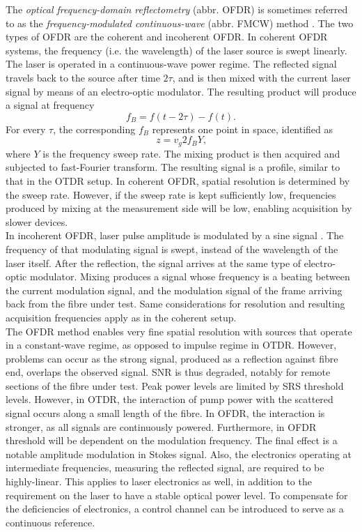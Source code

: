 \documentclass{standalone}
\begin{document}
The \textit{optical frequency-domain reflectometry} (abbr. OFDR) is sometimes referred to as the \textit{frequency-modulated continuous-wave} (abbr. FMCW) method \cite{Farahani1999}\cite{Hartog2017}. The two types of OFDR are the coherent and incoherent OFDR. In coherent OFDR systems, the frequency (i.e. the wavelength) of the laser source is swept linearly. The laser is operated in a continuous-wave power regime. The reflected signal travels back to the source after time $2 \tau$, and is then mixed with the current laser signal by means of an electro-optic modulator. The resulting product will produce a signal at frequency
\begin{equation}
f_B = f(t - 2 \tau) - f(t) \textrm{.}
\end{equation}
For every $\tau$, the corresponding $f_B$ represents one point in space, identified as
\begin{equation}
z = v_g 2 f_B Y \textrm{,}
\end{equation}
where $Y$ is the frequency sweep rate. The mixing product is then acquired and subjected to fast-Fourier transform. The resulting signal is a profile, similar to that in the OTDR setup. In coherent OFDR, spatial resolution is determined by the sweep rate. However, if the sweep rate is kept sufficiently low, frequencies produced by mixing at the measurement side will be low, enabling acquisition by slower devices. \\

In incoherent OFDR, laser pulse amplitude is modulated by a sine signal \cite{emir}. The frequency of that modulating signal is swept, instead of the wavelength of the laser itself. After the reflection, the signal arrives at the same type of electro-optic modulator. Mixing produces a signal whose frequency is a beating between the current modulation signal, and the modulation signal of the frame arriving back from the fibre under test. Same considerations for resolution and resulting acquisition frequencies apply as in the coherent setup. \\

The OFDR method enables very fine spatial resolution with sources that operate in a constant-wave regime, as opposed to impulse regime in OTDR. However, problems can occur as the strong signal, produced as a reflection against fibre end, overlaps the observed signal. SNR is thus degraded, notably for remote sections of the fibre under test. Peak power levels are limited by SRS threshold levels. However, in OTDR, the interaction of pump power with the scattered signal occurs along a small length of the fibre. In OFDR, the interaction is stronger, as all signals are continuously powered. Furthermore, in OFDR threshold will be dependent on the modulation frequency. The final effect is a notable amplitude modulation in Stokes signal. Also, the electronics operating at intermediate frequencies, measuring the reflected signal, are required to be highly-linear. This applies to laser electronics as well, in addition to the requirement on the laser to have a stable optical power level. To compensate for the deficiencies of electronics, a control channel can be introduced to serve as a continuous reference.
\end{document}
